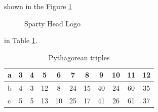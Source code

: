  shown in the Figure \ref{fig:figure1}
\begin{figure}[htb!]
    \centering
    \caption{Sparty Head Logo }
    \label{fig:figure1}
\end{figure}

 in Table \ref{tab:table1}.
\begin{table}[htb!]
\begin{center}
\begin{tabular}{ | l  ||c|c|c|c|c|c|c|c|c|c|}
\hline
	a		& 3	& 4	& 5	& 6	& 7 & 8 & 9 & 10 & 11 & 12 \\
\hline
	b		& 4	& 3 & 12 & 8 & 24 & 15 & 40 & 24 & 60 & 35 \\
\hline
	c	    & 5	& 5 & 13 & 10 & 25 & 17	& 41 & 26 & 61 & 37 \\
\hline
\end{tabular}
\caption{Pythagorean triples}
\label{tab:table1}
\end{center}
\end{table}








